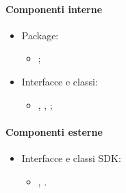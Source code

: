 \documentclass[../Funzionalita.tex]{subfiles}
\begin{document}
			\paragraph*{Componenti interne}
			\begin{itemize}
			
				\item Package:
				\begin{itemize}
					\item[] \usersetting;
				\end{itemize}
				
				\item Interfacce e classi:
				\begin{itemize}
					\item[] \Setting, \SettingImp, \PathPreference;
				\end{itemize}
				
			\end{itemize}
			
			
			\paragraph*{Componenti esterne}
			
			\begin{itemize}
				\item Interfacce e classi SDK:
				\begin{itemize}
					\item[] \SharedPreference, \SharedPreferenceEditor.
				\end{itemize}
			\end{itemize}
\end{document}
